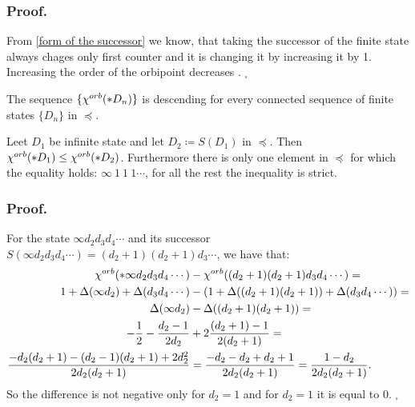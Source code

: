 \subsubsection{Proof.}
From \ref{form of the successor} we know, that taking the successor 
of the finite state always chages  
only first counter and it is changing it by increasing it by 1. 
Increasing the order of the orbipoint  
decreases \Eoc. $_\square$

\begin{corollary}\label{connected sequences corollary}
The sequence $\{{\chi^{orb}(*D_n)}\}$ is descending for every connected sequence 
of finite states $\{D_n\}$ in $\preceq$. 
\end{corollary}

\begin{lemma}
Leet $D_1$ be infinite state and let $D_2 \coloneqq S(D_1)$ in $\preceq$. 
Then ${\chi^{orb}(*D_1)} \leq {\chi^{orb}(*D_2)}$. Furthermore there is only one element in $\preceq$ for 
which the equality holds: $\infty\ 1\ 1\ 1\cdots$, for all the rest the inequality is strict. 
\end{lemma}
\subsubsection{Proof.}

For the state $\infty d_2d_3d_4\cdots$ and its successor 
$S(\infty d_2d_3d_4\cdots) = (d_2+1)(d_2+1)d_3\cdots$, we have that: 
\begin{align}
{\chi^{orb}(*\infty d_2d_3d_4\cdots)} &- {\chi^{orb}((d_2+1)(d_2+1)d_3d_4\cdots)} = \notag \\
1 + \Delta(\infty d_2) + \Delta(d_3d_4\cdots) &- 
(1 + \Delta((d_2+1)(d_2+1)) + \Delta(d_3d_4\cdots)) = \notag \\ 
\Delta(\infty d_2) &- \Delta((d_2+1)(d_2+1)) = \notag \\
-\frac{1}{2}- \frac{d_2-1}{2d_2} &+ 2\frac{(d_2+1)-1}{2(d_2+1)} =  \\
\frac{-d_2(d_2+1) - (d_2-1)(d_2+1) + 2d_2^2}{2d_2(d_2+1)}& = 
\frac{-d_2 -d_2 + d_2 +1 }{2d_2(d_2+1)} = 
\frac{1- d_2}{2d_2(d_2 + 1)}. \notag
\end{align}
So the difference is not negative only for $d_2 = 1$ and for $d_2 = 1$ it is equal 
to $0$. $_\square$ 

